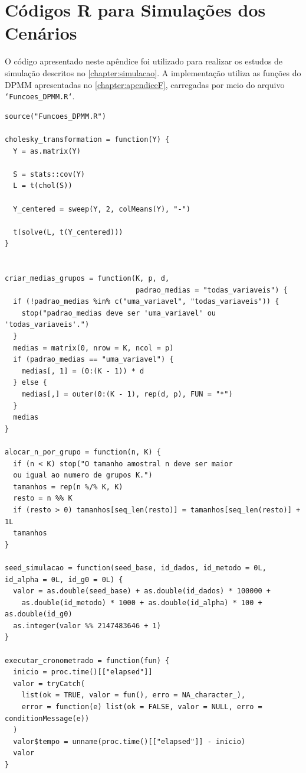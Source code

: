 \chapter{Códigos R para Simulações dos Cenários}
\label{chapter:apendiceG}

O código apresentado neste apêndice foi utilizado para realizar os estudos de simulação descritos no \autoref{chapter:simulacao}. A implementação utiliza as funções do DPMM apresentadas no \autoref{chapter:apendiceF}, carregadas por meio do arquivo \texttt{`Funcoes\_DPMM.R`}.

\begin{verbatim}
source("Funcoes_DPMM.R")

cholesky_transformation = function(Y) {
  Y = as.matrix(Y)

  S = stats::cov(Y)
  L = t(chol(S))

  Y_centered = sweep(Y, 2, colMeans(Y), "-")

  t(solve(L, t(Y_centered)))
}


criar_medias_grupos = function(K, p, d,
                               padrao_medias = "todas_variaveis") {
  if (!padrao_medias %in% c("uma_variavel", "todas_variaveis")) {
    stop("padrao_medias deve ser 'uma_variavel' ou 'todas_variaveis'.")
  }
  medias = matrix(0, nrow = K, ncol = p)
  if (padrao_medias == "uma_variavel") {
    medias[, 1] = (0:(K - 1)) * d
  } else {
    medias[,] = outer(0:(K - 1), rep(d, p), FUN = "*")
  }
  medias
}

alocar_n_por_grupo = function(n, K) {
  if (n < K) stop("O tamanho amostral n deve ser maior 
  ou igual ao numero de grupos K.")
  tamanhos = rep(n %/% K, K)
  resto = n %% K
  if (resto > 0) tamanhos[seq_len(resto)] = tamanhos[seq_len(resto)] + 1L
  tamanhos
}

seed_simulacao = function(seed_base, id_dados, id_metodo = 0L,
id_alpha = 0L, id_g0 = 0L) {
  valor = as.double(seed_base) + as.double(id_dados) * 100000 +
    as.double(id_metodo) * 1000 + as.double(id_alpha) * 100 + as.double(id_g0)
  as.integer(valor %% 2147483646 + 1)
}

executar_cronometrado = function(fun) {
  inicio = proc.time()[["elapsed"]]
  valor = tryCatch(
    list(ok = TRUE, valor = fun(), erro = NA_character_),
    error = function(e) list(ok = FALSE, valor = NULL, erro = conditionMessage(e))
  )
  valor$tempo = unname(proc.time()[["elapsed"]] - inicio)
  valor
}



\end{verbatim}
